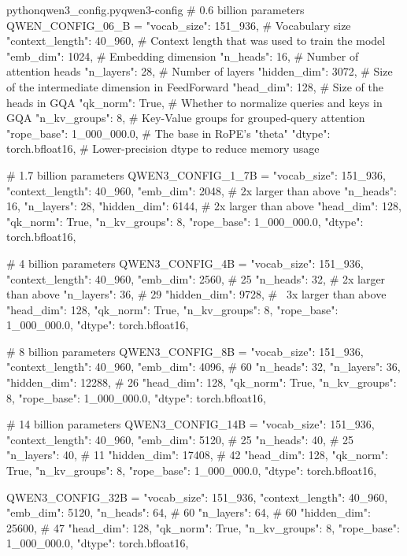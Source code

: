 \documentclass[lang=cn,newtx,10pt,scheme=chinese]{elegantbook}
\begin{document}
\begin{codebox}{python}{qwen3\_config.py}{qwen3-config}
# 0.6 billion parameters
QWEN_CONFIG_06_B = {
    "vocab_size": 151_936,           # Vocabulary size
    "context_length": 40_960,        # Context length that was used to train the model
    "emb_dim": 1024,                 # Embedding dimension
    "n_heads": 16,                   # Number of attention heads
    "n_layers": 28,                  # Number of layers
    "hidden_dim": 3072,              # Size of the intermediate dimension in FeedForward
    "head_dim": 128,                 # Size of the heads in GQA
    "qk_norm": True,                 # Whether to normalize queries and keys in GQA
    "n_kv_groups": 8,                # Key-Value groups for grouped-query attention
    "rope_base": 1_000_000.0,        # The base in RoPE's "theta"
    "dtype": torch.bfloat16,         # Lower-precision dtype to reduce memory usage
}

# 1.7 billion parameters
QWEN3_CONFIG_1_7B = {
    "vocab_size": 151_936,
    "context_length": 40_960,
    "emb_dim": 2048,                 # 2x larger than above
    "n_heads": 16,
    "n_layers": 28,
    "hidden_dim": 6144,              # 2x larger than above
    "head_dim": 128,
    "qk_norm": True,
    "n_kv_groups": 8,
    "rope_base": 1_000_000.0,
    "dtype": torch.bfloat16,
}

# 4 billion parameters
QWEN3_CONFIG_4B = {
    "vocab_size": 151_936,
    "context_length": 40_960,
    "emb_dim": 2560,                 # 25%
    "n_heads": 32,                   # 2x larger than above
    "n_layers": 36,                  # 29%
    "hidden_dim": 9728,              # ~3x larger than above
    "head_dim": 128,
    "qk_norm": True,
    "n_kv_groups": 8,
    "rope_base": 1_000_000.0,
    "dtype": torch.bfloat16,
}

# 8 billion parameters
QWEN3_CONFIG_8B = {
    "vocab_size": 151_936,
    "context_length": 40_960,
    "emb_dim": 4096,                 # 60%
    "n_heads": 32,
    "n_layers": 36,
    "hidden_dim": 12288,             # 26%
    "head_dim": 128,
    "qk_norm": True,
    "n_kv_groups": 8,
    "rope_base": 1_000_000.0,
    "dtype": torch.bfloat16,
}

# 14 billion parameters
QWEN3_CONFIG_14B = {
    "vocab_size": 151_936,
    "context_length": 40_960,
    "emb_dim": 5120,                 # 25%
    "n_heads": 40,                   # 25%
    "n_layers": 40,                  # 11%
    "hidden_dim": 17408,             # 42%
    "head_dim": 128,
    "qk_norm": True,
    "n_kv_groups": 8,
    "rope_base": 1_000_000.0,
    "dtype": torch.bfloat16,
}

QWEN3_CONFIG_32B = {
    "vocab_size": 151_936,
    "context_length": 40_960,
    "emb_dim": 5120,
    "n_heads": 64,                   # 60%
    "n_layers": 64,                  # 60%
    "hidden_dim": 25600,             # 47%
    "head_dim": 128,
    "qk_norm": True,
    "n_kv_groups": 8,
    "rope_base": 1_000_000.0,
    "dtype": torch.bfloat16,
}
\end{codebox}
\end{document}
